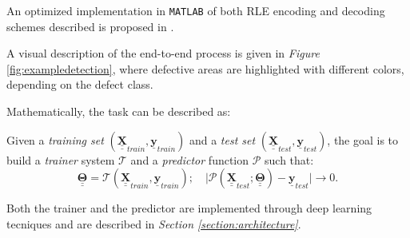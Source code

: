         \par{
            An optimized implementation in \texttt{MATLAB} of both RLE encoding and decoding schemes described is proposed in \cite{antonioterpin:github}.
        }
        \par{
            A visual description of the end-to-end process is given in \emph{Figure} \ref{fig:exampledetection}, where defective areas are highlighted with different colors, depending on the defect class.
        }
        \par{
            Mathematically, the task can be described as:
        }
        \par{
            Given a \emph{training set} $\left(\underline{\underline{\mathbf{X}}}_{train}, \underline{\mathbf{y}}_{train}\right)$ and a \emph{test set} $\left(\underline{\underline{\mathbf{X}}}_{test}, \underline{\mathbf{y}}_{test}\right)$, the goal is to build a \emph{trainer} system $\mathcal{T}$ and a \emph{predictor} function $\mathcal{P}$ such that:
            \begin{equation*}
                \underline{\underline{\mathbf{\Theta}}} = \mathcal{T}\left(\underline{\underline{\mathbf{X}}}_{train}, \underline{\mathbf{y}}_{train}\right);\quad \lvert \mathcal{P}\left(\underline{\underline{\mathbf{X}}}_{test}; \underline{\underline{\mathbf{\Theta}}}\right) - \underline{\mathbf{y}}_{test} \rvert \rightarrow 0.
            \end{equation*}
        }
        \par{
            Both the trainer and the predictor are implemented through deep learning tecniques and are described in \emph{Section \ref{section:architecture}}.
        }

